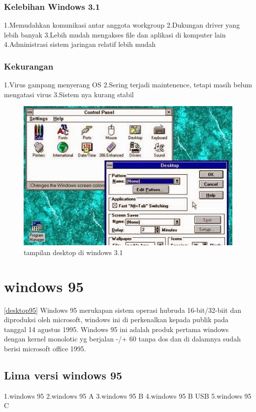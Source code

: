	\subsubsection{Kelebihan Windows 3.1}
		1.Memudahkan komunikasi antar anggota workgroup
		2.Dukungan driver yang lebih banyak
		3.Lebih mudah mengakses file dan aplikasi di komputer lain
		4.Administrasi sistem jaringan relatif lebih mudah
	\subsubsection{Kekurangan}
		1.Virus gampang menyerang OS
		2.Sering terjadi maintenence, tetapi masih belum mengatasi virus
		3.Sistem nya kurang stabil

\begin{figure}[ht]
\centerline{\includegraphics[width=1\textwidth]{figures/Windows31.JPG}}
\caption{tampilan desktop di windows 3.1}
\label{Windows31}
\end{figure}

\section{windows 95}
\ref{desktop95}
	Windows 95 merukapan sistem operasi hubruda 16-bit/32-biit dan 
	diproduksi oleh microsoft, windows ini di perkenalkan kepada 
	publik pada tanggal 14 agustus 1995. Windows 95 ini adalah produk 
	pertama windows dengan kernel monolotic yg berjalan  -/+  60 tanpa dos 
	dan di dalamnya sudah berisi microsoft office 1995. \cite{petzold1996programming} 
	\subsection{Lima versi windows 95}
		1.windows 95
		2.windows 95 A
		3.windows 95 B
		4.windows 95 B USB
		5.windows 95 C



